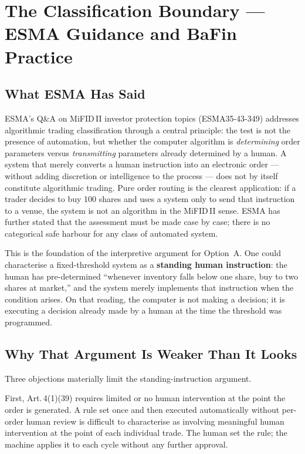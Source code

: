 \documentclass[12pt,a4paper]{report}
\begin{document}
\section{The Classification Boundary --- ESMA Guidance and BaFin Practice}

\subsection{What ESMA Has Said}

ESMA's Q\&A on MiFID\,II investor protection topics (ESMA35-43-349) addresses
algorithmic trading classification through a central principle: the test is not the
presence of automation, but whether the computer algorithm is \textit{determining} order
parameters versus \textit{transmitting} parameters already determined by a human.
A system that merely converts a human instruction into an electronic order --- without
adding discretion or intelligence to the process --- does not by itself constitute
algorithmic trading. Pure order routing is the clearest application: if a trader decides
to buy 100 shares and uses a system only to send that instruction to a venue, the system
is not an algorithm in the MiFID\,II sense. ESMA has further stated that the assessment
must be made case by case; there is no categorical safe harbour for any class of automated
system.

This is the foundation of the interpretive argument for Option~A. One could characterise
a fixed-threshold system as a \textbf{standing human instruction}: the human has
pre-determined ``whenever inventory falls below one share, buy to two shares at market,''
and the system merely implements that instruction when the condition arises. On that
reading, the computer is not making a decision; it is executing a decision already made
by a human at the time the threshold was programmed.

\subsection{Why That Argument Is Weaker Than It Looks}

Three objections materially limit the standing-instruction argument.

First, Art.\,4(1)(39) requires limited or no human intervention at the point the order
is generated. A rule set once and then executed automatically without per-order human
review is difficult to characterise as involving meaningful human intervention at the
point of each individual trade. The human set the rule; the machine applies it to each
cycle without any further approval.
\end{document}
